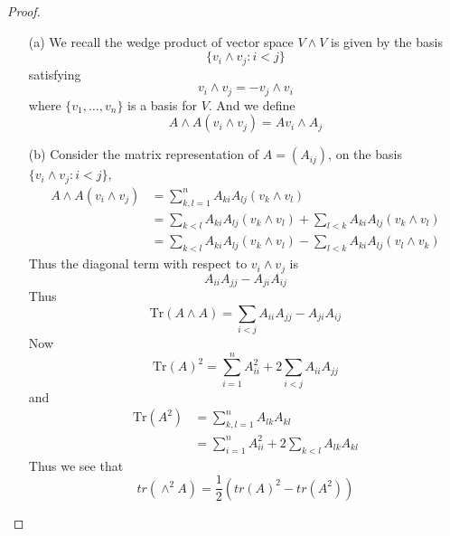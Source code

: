 \begin{proof}
    \begin{itemize}
        \item[(a)] We recall the wedge product of vector space $V\wedge V$ is given by the basis 
        \begin{equation*}
            \{v_i\wedge v_j: i<j\}
        \end{equation*}
        satisfying 
        \begin{equation*}
            v_i\wedge v_j=-v_j\wedge v_i
        \end{equation*}
        where $\{v_1,\dots, v_n\}$ is a basis for $V$. And we define 
        \begin{equation*}
            A\wedge A(v_i\wedge v_j)=Av_i\wedge A_j
        \end{equation*}
        \item[(b)] Consider the matrix representation of $A=(A_{ij})$, on the basis $\{v_i\wedge v_j: i<j\}$, 
        \begin{align*}
            A\wedge A(v_i\wedge v_j)&=\sum_{k,l=1}^nA_{ki}A_{lj}(v_k\wedge v_l)\\
            &=\sum_{k<l}A_{ki}A_{lj}(v_k\wedge v_l)+\sum_{l<k}A_{ki}A_{lj}(v_k\wedge v_l)\\
            &=\sum_{k<l}A_{ki}A_{lj}(v_k\wedge v_l)-\sum_{l<k}A_{ki}A_{lj}(v_l\wedge v_k)
        \end{align*}
        Thus the diagonal term with respect to $v_i\wedge v_j$ is 
        \begin{equation*}
            A_{ii}A_{jj}-A_{ji}A_{ij}
        \end{equation*}
        Thus 
        \begin{equation*}
            \text{Tr}(A\wedge A)=\sum_{i<j}A_{ii}A_{jj}-A_{ji}A_{ij}
        \end{equation*}
        Now 
        \begin{equation*}
            \text{Tr}(A)^2=\sum_{i=1}^nA_{ii}^2+2\sum_{i<j}A_{ii}A_{jj}
        \end{equation*}
        and 
        \begin{align*}
            \text{Tr}(A^2)&=\sum_{k,l=1}^nA_{lk}A_{kl}\\
            &=\sum_{i=1}^nA_{ii}^2+2\sum_{k<l}A_{lk}A_{kl}
        \end{align*}
        Thus we see that 
        \[tr(\wedge^{2}A)=\frac{1}{2}(tr(A)^{2}-tr(A^{2}))\]
    \end{itemize}
\end{proof}


